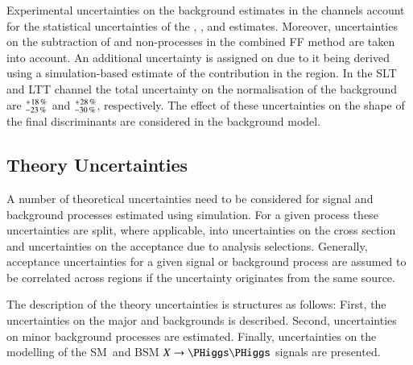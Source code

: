 Experimental uncertainties on the \faketauhadvis background estimates in the
\lephad channels account for the statistical uncertainties of the \FFqcd,
\FFttbar, and \rqcd estimates. Moreover, uncertainties on the subtraction of
\ttbar and non-\ttbar processes in the combined FF method are taken into
account. An additional uncertainty is assigned on \rqcd due to it being derived
using a simulation-based estimate of the \ttbarFakes contribution in the \antiid
region. In the \lephad SLT and LTT channel the total uncertainty on the
normalisation of the \faketauhadvis background are
$^{\hspace{0.25pt}+\hspace{0.25pt}18\,\%}_{-23\,\%}$ and
$^{\hspace{0.25pt}+\hspace{0.25pt}28\,\%}_{-30\,\%}$, respectively. The effect
of these uncertainties on the shape of the final discriminants are considered in
the background model.



\subsection{Theory Uncertainties}%
\label{sec:modelling_uncertainties}%
\label{sec:theory_uncertainties}

A number of theoretical uncertainties need to be considered for signal and
background processes estimated using simulation. For a given process these
uncertainties are split, where applicable, into uncertainties on the cross
section and uncertainties on the acceptance due to analysis
selections. Generally, acceptance uncertainties for a given signal or background
process are assumed to be correlated across regions if the uncertainty
originates from the same source.

The description of the theory uncertainties is structures as follows: First, the
uncertainties on the major \ZHF and \ttbar backgrounds is described. Second,
uncertainties on minor background processes are estimated. Finally,
uncertainties on the modelling of the SM~\HH and BSM $X \to \HH$ signals are
presented.


